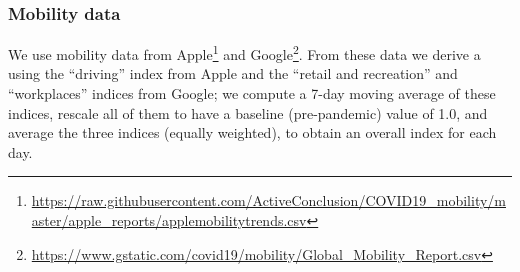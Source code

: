 \documentclass[12pt]{article}\usepackage[]{graphicx}\usepackage[]{color}
\begin{document}
\hypertarget{Mobility data}{}
\subsubsection*{Mobility data}

We use mobility data from
Apple\footnote{\url{https://raw.githubusercontent.com/ActiveConclusion/COVID19_mobility/master/apple_reports/applemobilitytrends.csv}}
and
Google\footnote{\url{https://www.gstatic.com/covid19/mobility/Global_Mobility_Report.csv}}.
From these data we derive a
 using the ``driving'' index from Apple
and the ``retail and recreation'' and ``workplaces'' indices from
Google; we compute a 7-day moving average of these indices, rescale
all of them to have a baseline (pre-pandemic) value of 1.0, and
average the three indices (equally weighted), to obtain an overall
index for each day.
\end{document}
